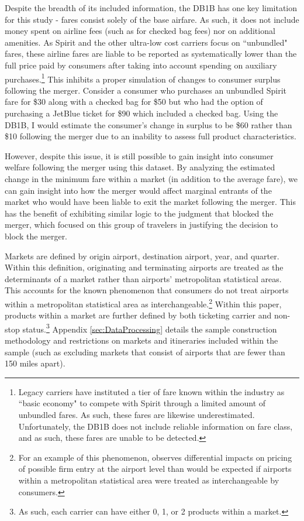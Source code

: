 \documentclass{article}
\begin{document}
    Despite the breadth of its included information, the DB1B has one key limitation for this study - fares consist solely of the base airfare. As such, it does not include money spent on airline fees (such as for checked bag fees) nor on additional amenities. As Spirit and the other ultra-low cost carriers focus on ``unbundled" fares, these airline fares are liable to be reported as systematically lower than the full price paid by consumers after taking into account spending on auxiliary purchases.\footnote{Legacy carriers have instituted a tier of fare known within the industry as ``basic economy" to compete with Spirit through a limited amount of unbundled fares. As such, these fares are likewise underestimated. Unfortunately, the DB1B does not include reliable information on fare class, and as such, these fares are unable to be detected.} This inhibits a proper simulation of changes to consumer surplus following the merger. Consider a consumer who purchases an unbundled Spirit fare for \$30 along with a checked bag for \$50 but who had the option of purchasing a JetBlue ticket for \$90 which included a checked bag. Using the DB1B, I would estimate the consumer's change in surplus to be \$60 rather than \$10 following the merger due to an inability to assess full product characteristics. 
    
    However, despite this issue, it is still possible to gain insight into consumer welfare following the merger using this dataset. By analyzing the estimated change in the minimum fare within a market (in addition to the average fare), we can gain insight into how the merger would affect marginal entrants of the market who would have been liable to exit the market following the merger. This has the benefit of exhibiting similar logic to the judgment that blocked the merger, which focused on this group of travelers in justifying the decision to block the merger. 
    	
	Markets are defined by origin airport, destination airport, year, and quarter. Within this definition, originating and terminating airports are treated as the determinants of a market rather than airports' metropolitan statistical areas. This accounts for the known phenomenon that consumers do not treat airports within a metropolitan statistical area as interchangeable.\footnote{For an example of this phenomenon, \citet{goolsbee_how_2008} observes differential impacts on pricing of possible firm entry at the airport level than would be expected if airports within a metropolitan statistical area were treated as interchangeable by consumers.} Within this paper, products within a market are further defined by both ticketing carrier and non-stop status.\footnote{As such, each carrier can have either 0, 1, or 2 products within a market.} Appendix \ref{sec:DataProcessing} details the sample construction methodology and restrictions on markets and itineraries included within the sample (such as excluding markets that consist of airports that are fewer than 150 miles apart).
	
\end{document}
